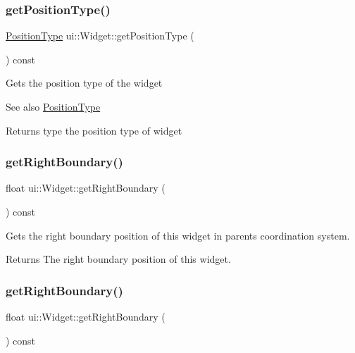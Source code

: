 \subsubsection{\texorpdfstring{get\+Position\+Type()}{getPositionType()}\hspace{0.1cm}{\footnotesize\ttfamily [2/2]}}
{\footnotesize\ttfamily \hyperlink{classui_1_1Widget_acfb8004ec169575dab6d3e8eb3e92b90}{Position\+Type} ui\+::\+Widget\+::get\+Position\+Type (\begin{DoxyParamCaption}{ }\end{DoxyParamCaption}) const}

Gets the position type of the widget

\begin{DoxySeeAlso}{See also}
{\ttfamily \hyperlink{classui_1_1Widget_acfb8004ec169575dab6d3e8eb3e92b90}{Position\+Type}}
\end{DoxySeeAlso}
\begin{DoxyReturn}{Returns}
type the position type of widget 
\end{DoxyReturn}
\mbox{\label{classui_1_1Widget_aadc5ba521f815795f2648ee356f26d91}} 
\subsubsection{\texorpdfstring{get\+Right\+Boundary()}{getRightBoundary()}\hspace{0.1cm}{\footnotesize\ttfamily [1/2]}}
{\footnotesize\ttfamily float ui\+::\+Widget\+::get\+Right\+Boundary (\begin{DoxyParamCaption}{ }\end{DoxyParamCaption}) const}

Gets the right boundary position of this widget in parent\textquotesingle{}s coordination system. \begin{DoxyReturn}{Returns}
The right boundary position of this widget. 
\end{DoxyReturn}
\mbox{\label{classui_1_1Widget_aadc5ba521f815795f2648ee356f26d91}} 
\subsubsection{\texorpdfstring{get\+Right\+Boundary()}{getRightBoundary()}\hspace{0.1cm}{\footnotesize\ttfamily [2/2]}}
{\footnotesize\ttfamily float ui\+::\+Widget\+::get\+Right\+Boundary (\begin{DoxyParamCaption}{ }\end{DoxyParamCaption}) const}

